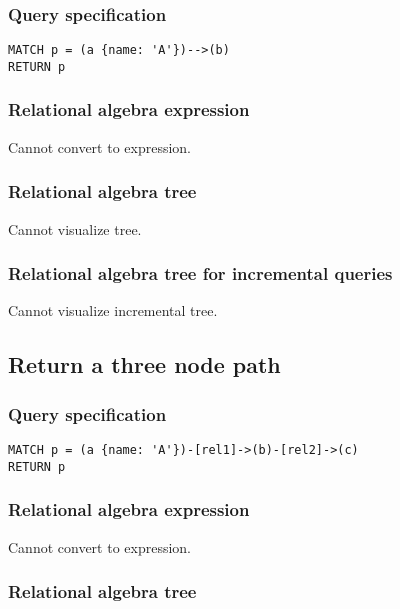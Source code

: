 \subsubsection*{Query specification}

\begin{lstlisting}
MATCH p = (a {name: 'A'})-->(b)
RETURN p
\end{lstlisting}

\subsubsection*{Relational algebra expression}

Cannot convert to expression.

\subsubsection*{Relational algebra tree}

Cannot visualize tree.

\subsubsection*{Relational algebra tree for incremental queries}

Cannot visualize incremental tree.

\subsection{Return a three node path}

\subsubsection*{Query specification}

\begin{lstlisting}
MATCH p = (a {name: 'A'})-[rel1]->(b)-[rel2]->(c)
RETURN p
\end{lstlisting}

\subsubsection*{Relational algebra expression}

Cannot convert to expression.

\subsubsection*{Relational algebra tree}

